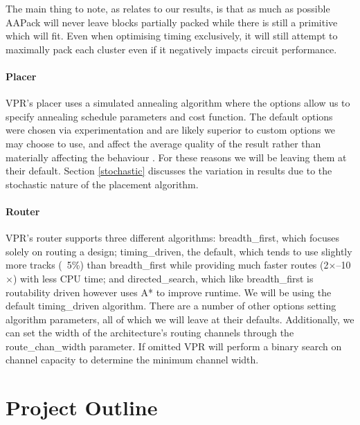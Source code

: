 \documentclass[12pt,final,oneside]{dwThesis} %
\begin{document}
   The main thing to
   note, as relates to our results, is that as much as possible AAPack will
   never leave blocks partially packed while there is still a primitive
   which will fit. Even when optimising timing exclusively, it will still
   attempt to maximally pack each cluster even if it negatively impacts circuit performance.

   \subsubsection{Placer} \gls{VPR}'s placer uses a simulated annealing
   algorithm where the options allow us to specify annealing schedule
   parameters and cost function. The default options were chosen via
   experimentation and are likely superior to custom options we may choose to
   use, and affect the average quality of the result rather than materially
   affecting the behaviour \cite{VPRManual, VPRBook}. For these reasons we will
   be leaving them at their default. Section \ref{stochastic} discusses the
   variation in results due to the stochastic nature of the placement
   algorithm.
   \subsubsection{Router} \gls{VPR}'s router supports three
   different algorithms: breadth\_first, which
   focuses solely on routing a design; timing\_driven, the default, which tends
   to use slightly more tracks (~5\%) than breadth\_first while providing much
   faster routes (2$\times$--10$\times$) with less CPU time; and
   directed\_search, which like breadth\_first is routability driven however
   uses A* to improve runtime. We will be using the default timing\_driven
   algorithm. There are a number of other options setting
   algorithm parameters, all of which we will leave at their defaults.
   Additionally, we can set the width of the architecture's routing channels through the
   route\_chan\_width parameter.
   If omitted \gls{VPR} will perform a binary search on channel capacity to
   determine the minimum channel width.


   \chapter{Project Outline}
\end{document}
